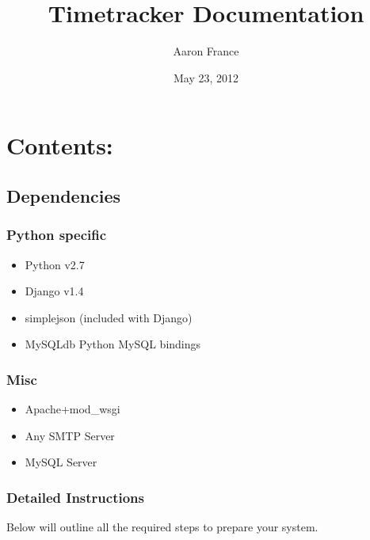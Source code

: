 \documentclass[letterpaper,10pt,english]{sphinxmanual}
\title{Timetracker Documentation}
\date{May 23, 2012}
\author{Aaron France}
\begin{document}
\maketitle
\tableofcontents
{}\label{index::doc}



\chapter{Contents:}
\label{index:contents}\label{index:welcome-to-timetracker-s-documentation}

\section{Dependencies}
\label{deps:dependencies}\label{deps::doc}

\subsection{Python specific}
\label{deps:python-specific}\begin{itemize}
\item {} 
Python v2.7

\item {} 
Django v1.4

\item {} 
simplejson (included with Django)

\item {} 
MySQLdb Python MySQL bindings

\end{itemize}


\subsection{Misc}
\label{deps:misc}\begin{itemize}
\item {} 
Apache+mod\_wsgi

\item {} 
Any SMTP Server

\item {} 
MySQL Server

\end{itemize}


\subsection{Detailed Instructions}
\label{deps:detailed-instructions}
Below will outline all the required steps to prepare your system.
\end{document}
